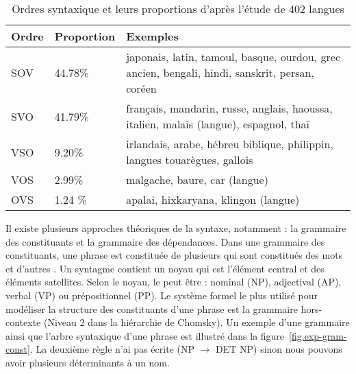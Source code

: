\documentclass{KodeBook}
\begin{document}
\begin{table}[ht]
	\centering
	\begin{tabular}{p{}p{}p{}}
		\hline\hline 
		\textbf{Ordre} & \textbf{Proportion} & \textbf{Exemples} \\
		\hline
		SOV & 44.78\% & japonais, latin, tamoul, basque, ourdou, grec ancien, bengali, hindi, sanskrit, persan, coréen \\
		SVO & 41.79\% & français, mandarin, russe, anglais, haoussa, italien, malais (langue), espagnol, thaï \\
		VSO & 9.20\% & irlandais, arabe, hébreu biblique, philippin, langues touarègues, gallois \\
		VOS & 2.99\% & malgache, baure, car (langue) \\
		OVS & 1.24 \% & apalai, hixkaryana, klingon (langue) \\
		\hline\hline
	\end{tabular}
	\caption[Ordres syntaxiques et leurs proportions d'après l'étude de 402 langues]{Ordres syntaxique et leurs proportions d'après l'étude de 402 langues \cite{1988-blake}}
	\label{tab:ordre}
\end{table}

Il existe plusieurs approches théoriques de la syntaxe, notamment : la grammaire des constituants et la grammaire des dépendances. 
Dans une grammaire des constituants, une phrase est constituée de plusieurs  qui sont constitués des mots et d'autres .
Un syntagme contient un noyau qui est l'élément central et des éléments satellites.
Selon le noyau, le  peut être : nominal (NP), adjectival (AP), verbal (VP) ou prépositionnel (PP).
Le système formel le plus utilisé pour modéliser la structure des constituants d'une phrase est la grammaire hors-contexte (Niveau 2 dans la hiérarchie de Chomsky).
Un exemple d'une grammaire ainsi que l'arbre syntaxique d'une phrase est illustré dans la figure~\ref{fig.exp-gram-const}.
La deuxième règle n'ai pas écrite (NP $ \rightarrow $ DET NP) sinon nous pouvons avoir plusieurs déterminants à un nom.
\end{document}
